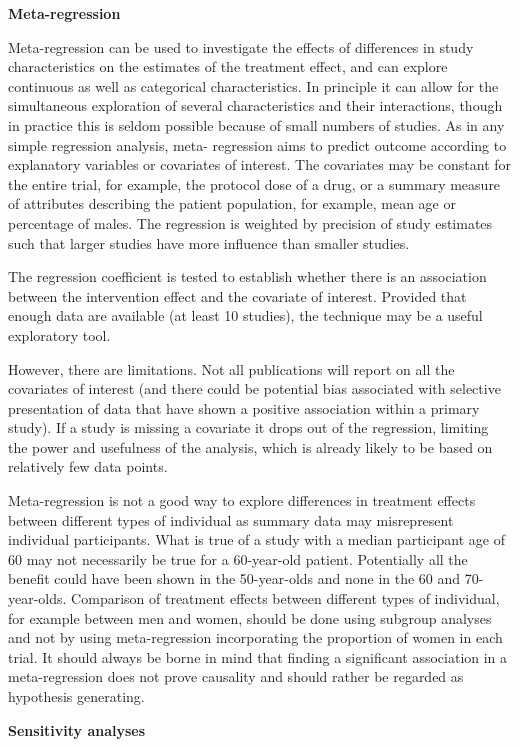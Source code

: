 \documentclass[
  10pt,
  a4paper,
  DIV=11,
  numbers=noendperiod]{scrreprt}
\begin{document}
\textbf{Meta-regression}

Meta-regression can be used to investigate the effects of differences in
study characteristics on the estimates of the treatment effect, and can
explore continuous as well as categorical characteristics. In principle
it can allow for the simultaneous exploration of several characteristics
and their interactions, though in practice this is seldom possible
because of small numbers of studies. As in any simple regression
analysis, meta- regression aims to predict outcome according to
explanatory variables or covariates of interest. The covariates may be
constant for the entire trial, for example, the protocol dose of a drug,
or a summary measure of attributes describing the patient population,
for example, mean age or percentage of males. The regression is weighted
by precision of study estimates such that larger studies have more
influence than smaller studies.

The regression coefficient is tested to establish whether there is an
association between the intervention effect and the covariate of
interest. Provided that enough data are available (at least 10 studies),
the technique may be a useful exploratory tool.

However, there are limitations. Not all publications will report on all
the covariates of interest (and there could be potential bias associated
with selective presentation of data that have shown a positive
association within a primary study). If a study is missing a covariate
it drops out of the regression, limiting the power and usefulness of the
analysis, which is already likely to be based on relatively few data
points.

Meta-regression is not a good way to explore differences in treatment
effects between different types of individual as summary data may
misrepresent individual participants. What is true of a study with a
median participant age of 60 may not necessarily be true for a
60-year-old patient. Potentially all the benefit could have been shown
in the 50-year-olds and none in the 60 and 70-year-olds. Comparison of
treatment effects between different types of individual, for example
between men and women, should be done using subgroup analyses and not by
using meta-regression incorporating the proportion of women in each
trial. It should always be borne in mind that finding a significant
association in a meta-regression does not prove causality and should
rather be regarded as hypothesis generating.

\textbf{Sensitivity analyses}
\end{document}
